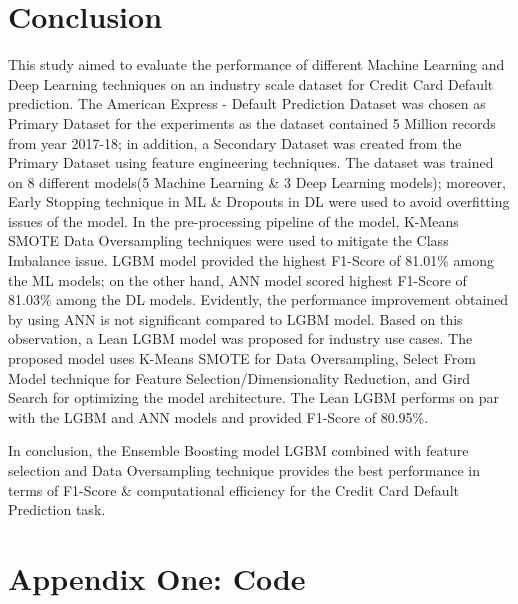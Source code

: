 \documentclass[twoside,11pt,a4paper]{article}
\begin{document}
\section{Conclusion}\label{sec:conclusion}
This study aimed to evaluate the performance of different Machine Learning and Deep Learning techniques on an industry scale dataset for Credit Card Default prediction. The American Express - Default Prediction Dataset \citep{amex-default-prediction-dataset} was chosen as Primary Dataset for the experiments as the dataset contained 5 Million records from year 2017-18; in addition, a Secondary Dataset was created from the Primary Dataset using feature engineering techniques. The dataset was trained on 8 different models(5 Machine Learning \& 3 Deep Learning models); moreover, Early Stopping technique in \acs{ML} \& Dropouts in \acs{DL} were used to avoid overfitting issues of the model. In the pre-processing pipeline of the model, K-Means \acs{SMOTE} Data Oversampling techniques were used to mitigate the Class Imbalance issue. \acs{LGBM} model provided the highest F1-Score of 81.01\% among the \acs{ML} models; on the other hand, \acs{ANN} model scored highest F1-Score of 81.03\% among the \acs{DL} models. Evidently, the performance improvement obtained by using \acs{ANN} is not significant compared to \acs{LGBM} model. Based on this observation, a Lean \acs{LGBM} model was proposed for industry use cases. The proposed model uses K-Means \acs{SMOTE} for Data Oversampling, Select From Model technique for Feature Selection/Dimensionality Reduction, and Gird Search for optimizing the model architecture. The Lean \acs{LGBM} performs on par with the \acs{LGBM} and \acs{ANN} models and provided F1-Score of 80.95\%. 

In conclusion,  the Ensemble Boosting model \acs{LGBM} combined with feature selection and Data Oversampling technique provides the best performance in terms of F1-Score \& computational efficiency for the Credit Card Default Prediction task.



\vfill
\clearpage
\lhead{}\rhead{}
{}
 


\vfill
\clearpage
\FloatBarrier
\section{Appendix One: Code}
\end{document}
